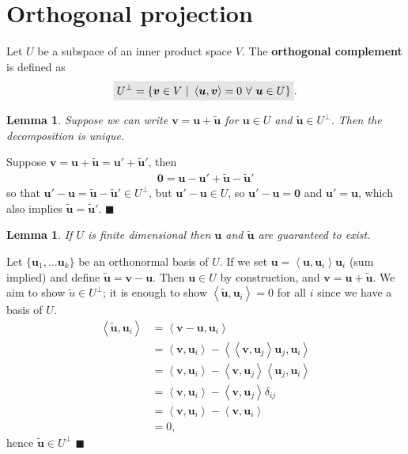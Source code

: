 \documentclass[letter-paper]{tufte-book}
\newtheorem{lemma}[theorem]{\color{pastel-blue}Lemma}
\newenvironment{proof}[1][Proof]{\begin{trivlist}
\item[\hskip \labelsep {\bfseries #1}]}{\end{trivlist}}
\newcommand{\inner}[2]{\left\langle #1, #2\right\rangle}
\newcommand{\Ob}{{\boldsymbol{0}}}
\newcommand{\ub}{{\boldsymbol{u}}}
\newcommand{\vb}{{\boldsymbol{v}}}
\newcommand{\qed}{\hfill$\blacksquare$}
\newcommand{\highlight}[1]{\mathchoice%
  {\colorbox{black!10}{$\displaystyle#1$}}%
  {\colorbox{black!10}{$\textstyle#1$}}%
  {\colorbox{black!10}{$\scriptstyle#1$}}%
  {\colorbox{black!10}{$\scriptscriptstyle#1$}}}%
\begin{document}

\section{Orthogonal projection}

Let $U$ be a subspace of an inner product space $V$. The \textbf{orthogonal complement} is defined as
\begin{align}
  \highlight{U^\perp = \{\vb \in V\ |\ \inner{\ub}{\vb}=0\ \forall\ \ub\in U\}}.
\end{align}

\begin{lemma}
  Suppose we can write $\vb = \ub + \tilde{\ub}$ for $\ub\in U$ and $\tilde{\ub} \in U^\perp$. Then the decomposition is unique.
\end{lemma}

\begin{proof}
  Suppose $\vb = \ub + \tilde{\ub} = \ub' + \tilde{\ub}'$, then
  \begin{align*}
    \Ob = \ub - \ub' + \tilde{\ub} - \tilde{\ub}'
  \end{align*}
  so that $\ub' - \ub = \tilde{\ub} - \tilde{\ub}' \in U^\perp$, but $\ub' - \ub \in U$, so $\ub' - \ub = \Ob$ and $\ub'=\ub$, which also implies $\tilde{\ub} = \tilde{\ub}'$. \qed
\end{proof}

\begin{lemma}
  If $U$ is finite dimensional then $\ub$ and $\tilde{\ub}$ are guaranteed to exist.
\end{lemma}

\begin{proof}
  Let $\{\ub_1, \ldots \ub_k\}$ be an orthonormal basis of $U$. If we set $\ub = \inner{\ub}{\ub_i}\ub_i$ (sum implied) and define $\tilde{\ub} = \vb - \ub$. Then $\ub \in U$ by construction, and $\vb = \ub + \tilde{\ub}$. We aim to show $\tilde{u} \in U^\perp$; it is enough to show $\inner{\tilde{\ub}}{\ub_i} = 0$ for all $i$ since we have a basis of $U$.
  \begin{align*}
    \inner{\tilde{\ub}}{\ub_i}
      &= \inner{\vb - \ub}{\ub_i}\\
      &= \inner{\vb}{\ub_i} - \inner{\inner{\vb}{\ub_j}\ub_j}{\ub_i}\\
      &= \inner{\vb}{\ub_i} - \inner{\vb}{\ub_j}\inner{\ub_j}{\ub_i}\\
      &= \inner{\vb}{\ub_i} - \inner{\vb}{\ub_j}\delta_{ij}\\
      &= \inner{\vb}{\ub_i} - \inner{\vb}{\ub_i}\\
      &=0,
  \end{align*}
  hence $\tilde{\ub}\in U^\perp$ \qed
\end{proof}
\end{document}
